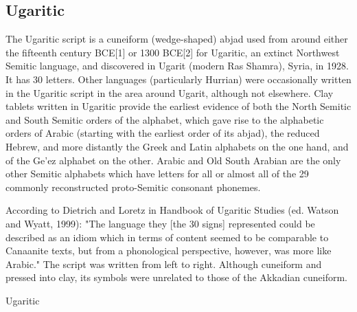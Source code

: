 \subsection{Ugaritic}

\newfontfamily{}

The Ugaritic script is a cuneiform (wedge-shaped) abjad used from around either the fifteenth century BCE[1] or 1300 BCE[2] for Ugaritic, an extinct Northwest Semitic language, and discovered in Ugarit (modern Ras Shamra), Syria, in 1928. It has 30 letters. Other languages (particularly Hurrian) were occasionally written in the Ugaritic script in the area around Ugarit, although not elsewhere.
Clay tablets written in Ugaritic provide the earliest evidence of both the North Semitic and South Semitic orders of the alphabet, which gave rise to the alphabetic orders of Arabic (starting with the earliest order of its abjad), the reduced Hebrew, and more distantly the Greek and Latin alphabets on the one hand, and of the Ge'ez alphabet on the other. Arabic and Old South Arabian are the only other Semitic alphabets which have letters for all or almost all of the 29 commonly reconstructed proto-Semitic consonant phonemes. 

According to Dietrich and Loretz in Handbook of Ugaritic Studies (ed. Watson and Wyatt, 1999): "The language they [the 30 signs] represented could be described as an idiom which in terms of content seemed to be comparable to Canaanite texts, but from a phonological perspective, however, was more like Arabic."
The script was written from left to right. Although cuneiform and pressed into clay, its symbols were unrelated to those of the Akkadian cuneiform.

\begin{scriptexample}[]{Ugaritic}
\end{scriptexample}